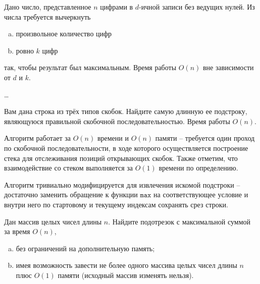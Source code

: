 \begin{problem}
    Дано число, представленное $n$ цифрами в $d$-ичной записи без
    ведущих нулей.  Из числа требуется вычеркнуть
    \begin{enumerate}[(a)]
        \item произвольное количество цифр
        \item ровно $k$ цифр
    \end{enumerate}
    так, чтобы результат был максимальным. Время работы $O(n)$ вне зависимости от $d$ и $k$.
\end{problem}

\begin{solution}
    \dots
\end{solution}


\begin{problem}
    Вам дана строка из трёх типов скобок. Найдите самую длинную ее
    подстроку, являющуюся правильной скобочной последовательностью. Время работы $O(n)$.
\end{problem}

\begin{solution}
    \leavevmode\vspace{1pt}
    

    Алгоритм работает за \( O(n) \) времени и \( O(n) \) памяти -- требуется один проход по скобочной
    последовательности, в ходе которого осуществляется построение стека для отслеживания позиций открывающих скобок.
    Также отметим, что взаимодействие со стеком выполняется за \( O(1) \) времени по определению.

    Алгоритм тривиально модифицируется для извлечения искомой подстроки -- достаточно заменить обращение к функции
    $\mathtt{max}$ на соответствующее условие и внутри него по стартовому и текущему индексам сохранять срез строки.
\end{solution}


\begin{problem}
    Дан массив целых чисел длины $n$. Найдите подотрезок с максимальной суммой за время $O(n)$,
    \begin{enumerate}[(a)]
        \item без ограничений на дополнительную память;
        \item имея возможность завести не более одного массива целых чисел длины $n$ плюс $O(1)$ памяти (исходный массив изменять нельзя).
    \end{enumerate}
\end{problem}

